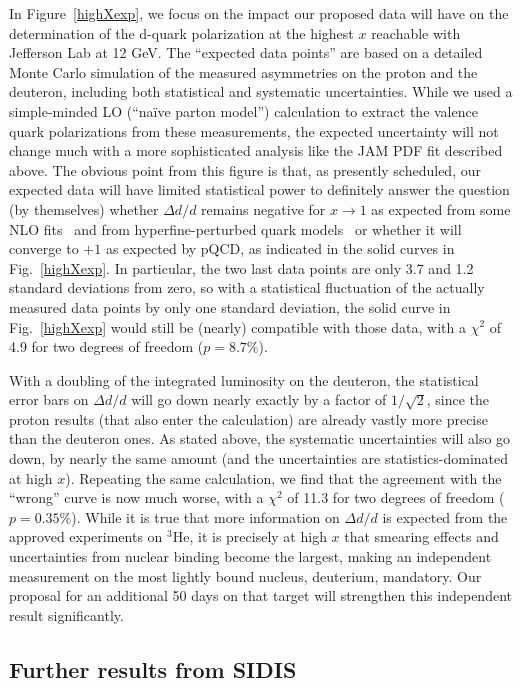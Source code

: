In Figure~\ref{highXexp}, we focus on the impact our proposed data will have on the determination of the d-quark polarization
at the highest $x$ reachable with Jefferson Lab at 12 GeV. The ``expected data points'' are based on a detailed Monte Carlo simulation
of the measured asymmetries on the proton and the deuteron, including both statistical and systematic uncertainties.
While we used a simple-minded LO (``na\"ive parton model'') calculation to extract the valence quark polarizations from these
measurements, the expected uncertainty will not change much with a more sophisticated analysis like the JAM PDF fit 
described above. The obvious point from this figure is that, as presently scheduled, our expected data will have limited
statistical power to definitely answer the question (by themselves) whether $\Delta d / d$ remains negative for $x \rightarrow 1$
as expected from some NLO fits~\cite{Leader:2006xc} and from hyperfine-perturbed quark models~\cite{Isgur:1998yb} or whether it 
will converge to $+1$ as expected by pQCD, as indicated in the solid curves in Fig.~\ref{highXexp}. In particular, the two last
data points are only 3.7 and 1.2 standard deviations from zero, so with a statistical fluctuation of the actually measured data points 
by only one standard deviation, the solid curve in Fig.~\ref{highXexp} would still be (nearly) compatible with those data,
with a $\chi^2$ of 4.9 for two degrees of freedom ($p = 8.7 \%$). 

With a doubling of the integrated luminosity on the deuteron, the statistical error bars on $\Delta d / d$ will go down nearly exactly
by a factor of $1/\sqrt{2}$, since the proton results (that also enter the calculation) are already vastly more precise than the deuteron
ones. As stated above, the systematic uncertainties will also go down, by nearly the same amount (and the uncertainties
 are statistics-dominated
at high $x$). Repeating the same calculation, we find that the agreement with the ``wrong'' curve is now much worse, with
a $\chi^2$ of 11.3 for two degrees of freedom ($p = 0.35 \%$). While it is true that more information on $\Delta d / d$ is expected
from the approved experiments on $^3$He, it is precisely at high $x$ that smearing effects and uncertainties from nuclear binding
become the largest, making an independent measurement on the most lightly bound nucleus, deuterium, mandatory. Our
proposal for an additional 50 days on that target will strengthen this independent result significantly.

\subsection{Further results from SIDIS}

